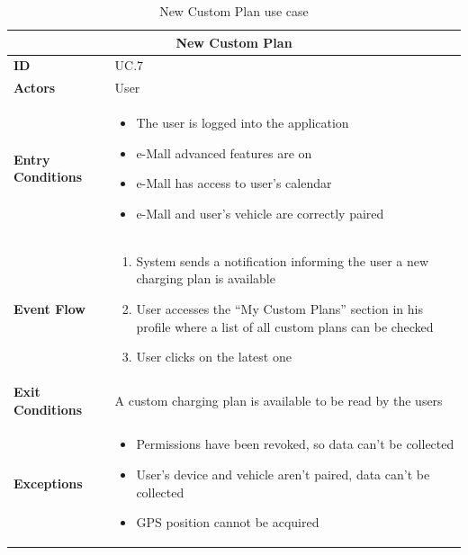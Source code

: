 \documentclass[12pt]{report}
\begin{document}
    \clearpage
    \begin{table}[h]
        \centering
        \begin{tabular}{ |p{4cm}|p{11cm}|  }
        \hline
        \multicolumn{2}{|c|}{\textbf{New Custom Plan}} \\
        \hline
            \textbf{ID} &  UC.7\\
        \hline
            \textbf{Actors} & User\\
        \hline
            \textbf{Entry Conditions} &
                \begin{itemize}
                    \item The user is logged into the application
                    \item e-Mall advanced features are on
                    \item e-Mall has access to user’s calendar
                    \item e-Mall and user’s vehicle are correctly paired
                \end{itemize}\\
        \hline
            \textbf{Event Flow} &
                \begin{enumerate}
                    \item System sends a notification informing the user a new charging plan is available
                    \item User accesses the “My Custom Plans” section in his profile where a list of all custom plans can be checked
                    \item User clicks on the latest one
                \end{enumerate}\\
        \hline
            \textbf{Exit Conditions} & A custom charging plan is available to be read by the users\\
        \hline
            \textbf{Exceptions} & 
                \begin{itemize}
                    \item Permissions have been revoked, so data can’t be collected
                    \item User’s device and vehicle aren’t paired, data can’t be collected
                    \item GPS position cannot be acquired
                \end{itemize}\\
        \hline
        \end{tabular}
        \caption{\label{demo-table}New Custom Plan use case}
    \end{table}
    \clearpage
\end{document}

